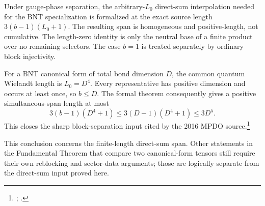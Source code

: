 \documentclass{article}
\begin{document}
Under gauge-phase separation, the arbitrary-$L_0$ direct-sum interpolation
needed for the BNT specialization is formalized at the exact source length
$3(b-1)(L_0+1)$. The resulting
span is homogeneous and positive-length, not cumulative. The length-zero
identity is only the neutral base of a finite product over no remaining
selectors. The case $b=1$ is treated separately by ordinary block injectivity.

For a BNT canonical form of total bond dimension $D$, the common quantum
Wielandt length is $L_0=D^4$. Every representative has positive dimension and
occurs at least once, so $b\leq D$. The formal theorem consequently gives a
positive simultaneous-span length at most
\[
  3(b-1)(D^4+1)\leq3(D-1)(D^4+1)\leq3D^5.
\]
This closes the sharp block-separation input cited by the 2016 MPDO source.\footnote{%
;
.}

This conclusion concerns the finite-length direct-sum span. Other statements
in the Fundamental Theorem that compare two canonical-form tensors still
require their own reblocking and sector-data arguments; those are logically
separate from the direct-sum input proved here.



\end{document}
